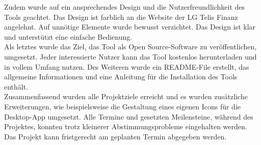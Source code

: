 Zudem wurde auf ein ansprechendes Design und die Nutzerfreundlichkeit des Tools geachtet. Das Design ist farblich an die Website der LG Telis Finanz angelehnt. Auf unnötige Elemente wurde bewusst verzichtet. Das Design ist klar und unterstützt eine einfache Bedienung.\\
Als letztes wurde das Ziel, das Tool als Open Source-Software zu veröffentlichen, umgesetzt. Jeder interessierte Nutzer kann das Tool kostenlos herunterladen und in vollem Umfang nutzen. Des Weiteren wurde ein README-File erstellt, das allgemeine Informationen und eine Anleitung für die Installation des Tools enthält.\\
Zusammenfassend wurden alle Projektziele erreicht und es wurden zusätzliche Erweiterungen, wie beispielsweise die Gestaltung eines eigenen Icons für die Desktop-App umgesetzt. Alle Termine und gesetzten Meilensteine, während des Projektes, konnten trotz kleinerer Abstimmungsprobleme eingehalten werden. Das Projekt kann fristgerecht am geplanten Termin abgegeben werden.

